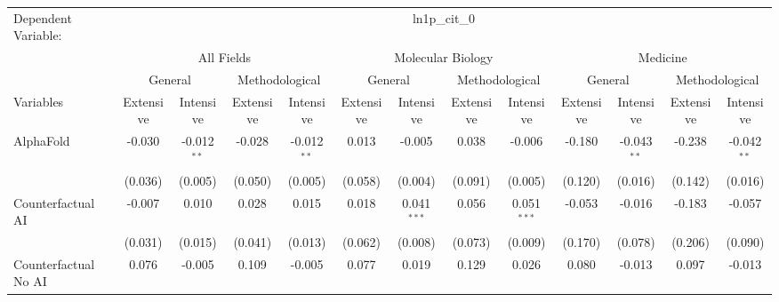 \begingroup
\centering
\begin{tabular}{lcccccccccccc}
   \tabularnewline \midrule \midrule
   Dependent Variable: & \multicolumn{12}{c}{ln1p\_cit\_0}\\
 & \multicolumn{4}{c}{All Fields} & \multicolumn{4}{c}{Molecular Biology} & \multicolumn{4}{c}{Medicine} \\
\cmidrule(lr){2-5} \cmidrule(lr){6-9} \cmidrule(lr){10-13}
 & \multicolumn{2}{c}{General} & \multicolumn{2}{c}{Methodological} & \multicolumn{2}{c}{General} & \multicolumn{2}{c}{Methodological} & \multicolumn{2}{c}{General} & \multicolumn{2}{c}{Methodological} \\
\cmidrule(lr){2-3} \cmidrule(lr){4-5} \cmidrule(lr){6-7} \cmidrule(lr){8-9} \cmidrule(lr){10-11} \cmidrule(lr){12-13}
Variables & \multicolumn{1}{c}{Extensive} & \multicolumn{1}{c}{Intensive} & \multicolumn{1}{c}{Extensive} & \multicolumn{1}{c}{Intensive} & \multicolumn{1}{c}{Extensive} & \multicolumn{1}{c}{Intensive} & \multicolumn{1}{c}{Extensive} & \multicolumn{1}{c}{Intensive} & \multicolumn{1}{c}{Extensive} & \multicolumn{1}{c}{Intensive} & \multicolumn{1}{c}{Extensive} & \multicolumn{1}{c}{Intensive} \\
\cmidrule(lr){1-1}\cmidrule(lr){2-2} \cmidrule(lr){3-3} \cmidrule(lr){4-4} \cmidrule(lr){5-5} \cmidrule(lr){6-6} \cmidrule(lr){7-7} \cmidrule(lr){8-8} \cmidrule(lr){9-9} \cmidrule(lr){10-10} \cmidrule(lr){11-11} \cmidrule(lr){12-12} \cmidrule(lr){13-13}
   AlphaFold                                & -0.030       & -0.012$^{**}$ & -0.028       & -0.012$^{**}$ & 0.013   & -0.005         & 0.038   & -0.006         & -0.180  & -0.043$^{**}$ & -0.238  & -0.042$^{**}$\\   
                                            & (0.036)      & (0.005)       & (0.050)      & (0.005)       & (0.058) & (0.004)        & (0.091) & (0.005)        & (0.120) & (0.016)       & (0.142) & (0.016)\\   
   Counterfactual AI                        & -0.007       & 0.010         & 0.028        & 0.015         & 0.018   & 0.041$^{***}$  & 0.056   & 0.051$^{***}$  & -0.053  & -0.016        & -0.183  & -0.057\\   
                                            & (0.031)      & (0.015)       & (0.041)      & (0.013)       & (0.062) & (0.008)        & (0.073) & (0.009)        & (0.170) & (0.078)       & (0.206) & (0.090)\\   
   Counterfactual No AI                     & 0.076        & -0.005        & 0.109        & -0.005        & 0.077   & 0.019          & 0.129   & 0.026          & 0.080   & -0.013        & 0.097   & -0.013\\   

\end{tabular}
